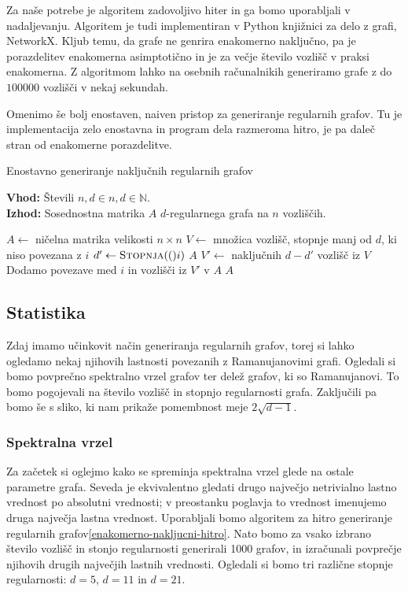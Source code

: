 Za naše potrebe je algoritem zadovoljivo hiter in ga bomo uporabljali v nadaljevanju. Algoritem je tudi implementiran v Python knjižnici za delo z grafi, NetworkX. Kljub temu, da grafe ne genrira enakomerno naključno, pa je porazdelitev enakomerna asimptotično in je za večje število vozlišč v praksi enakomerna. Z algoritmom lahko na osebnih računalnikih generiramo grafe z do \(100 000\) vozlišči v nekaj sekundah.

Omenimo še bolj enostaven, naiven pristop za generiranje regularnih grafov. Tu je implementacija zelo enostavna in program dela razmeroma hitro, je pa daleč stran od enakomerne porazdelitve.

\begin{algorithm}[ht]
    \caption{Enostavno generiranje naključnih regularnih grafov}
    \label{enakomerno-nakljucni-hitro}
    \raggedright
    \textbf{Vhod:} Števili \(n, d \in n, d \in \mathbb N\). \\
    \textbf{Izhod:} Sosednostna matrika \(A\) \(d\)-regularnega grafa na \(n\) vozliščih.
    \begin{algorithmic}[1]
        \State \(A \gets\) ničelna matrika velikosti \(n \times n\)
        \State \(V \gets \) množica vozlišč, stopnje manj od \(d\), ki niso povezana z \(i\)
        \State \(d' \gets \Call{Stopnja}(i)\)
        \State \Return \(A\)
        \EndIf
        \State \(V' \gets \) naključnih \(d-d'\) vozlišč iz \(V\)
        \State Dodamo povezave med \(i\) in vozlišči iz \(V'\) v \(A\)
        \EndFor
        \State \Return $A$
        \EndFunction
    \end{algorithmic}
\end{algorithm}

\subsection{Statistika}
Zdaj imamo učinkovit način generiranja regularnih grafov, torej si lahko ogledamo nekaj njihovih lastnosti povezanih z Ramanujanovimi grafi. Ogledali si bomo povprečno spektralno vrzel grafov ter delež grafov, ki so Ramanujanovi. To bomo pogojevali na število vozlišč in stopnjo regularnosti grafa. Zaključili pa bomo še s sliko, ki nam prikaže pomembnost meje \(2\sqrt{d-1}\).

\subsubsection{Spektralna vrzel}
Za začetek si oglejmo kako se spreminja spektralna vrzel glede na ostale parametre grafa. Seveda je ekvivalentno gledati drugo največjo netrivialno lastno vrednost po absolutni vrednosti; v preostanku poglavja to vrednost imenujemo druga največja lastna vrednost. Uporabljali bomo algoritem za hitro generiranje regularnih grafov\ref{enakomerno-nakljucni-hitro}. Nato bomo za vsako izbrano število vozlišč in stonjo regularnosti generirali 1000 grafov, in izračunali povprečje njihovih drugih največjih lastnih vrednosti. Ogledali si bomo tri različne stopnje regularnosti: \(d=5\), \(d=11\) in \(d=21\).

